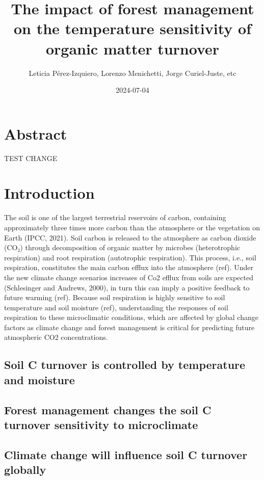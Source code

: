 \documentclass[
]{article}
\title{The impact of forest management on the temperature sensitivity of organic matter turnover}
\author{Leticia Pérez-Izquiero, Lorenzo Menichetti, Jorge Curiel-Juste, etc}
\date{2024-07-04}
\begin{document}
\maketitle

{
\setcounter{tocdepth}{2}
\tableofcontents
}
\section{Abstract}\label{abstract}

TEST CHANGE

\section{Introduction}\label{introduction}

The soil is one of the largest terrestrial reservoirs of carbon, containing approximately three times more carbon than the atmosphere or the vegetation on Earth (IPCC, 2021). Soil carbon is released to the atmosphere as carbon dioxide (CO₂) through decomposition of organic matter by microbes (heterotrophic respiration) and root respiration (autotrophic respiration). This process, i.e., soil respiration, constitutes the main carbon efflux into the atmosphere (ref). Under the new climate change scenarios increases of Co2 efflux from soils are expected (Schlesinger and Andrews, 2000), in turn this can imply a positive feedback to future warming (ref). Because soil respiration is highly sensitive to soil temperature and soil moisture (ref), understanding the responses of soil respiration to these microclimatic conditions, which are affected by global change factors as climate change and forest management is critical for predicting future atmospheric CO2 concentrations.

\subsection{Soil C turnover is controlled by temperature and moisture}\label{soil-c-turnover-is-controlled-by-temperature-and-moisture}

\subsection{Forest management changes the soil C turnover sensitivity to microclimate}\label{forest-management-changes-the-soil-c-turnover-sensitivity-to-microclimate}

\subsection{Climate change will influence soil C turnover globally}\label{climate-change-will-influence-soil-c-turnover-globally}
\end{document}
